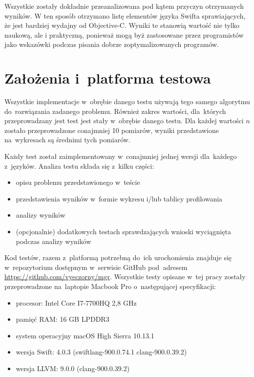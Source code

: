 \documentclass[mgr, shortabstract]{iithesis}
\begin{document}
Wszystkie zostały dokładnie przeanalizowana pod kątem przyczyn otrzymanych wyników. W ten sposób otrzymano listę elementów języka Swifta sprawiających, że jest bardziej wydajny od Objective-C. Wyniki te stanowią wartość nie tylko naukową, ale i praktyczną, ponieważ mogą byż zastosowane przez programistów jako wskazówki podczas pisania dobrze zoptymalizowanych programów.


\section{Założenia i~platforma testowa}

Wszystkie implementacje w~obrębie danego testu używają tego samego algorytmu do~rozwiązania zadanego problemu. Również zakres wartości, dla~których przeprowadzany jest test jest stały w~obrębie danego testu. Dla każdej wartości $n$ zostało przeprowadzone conajmniej 10 pomiarów, wyniki przedstawione na~wykresach są średnimi tych pomiarów.

Każdy test został zaimplementowany w~conajmniej jednej wersji dla~każdego z~języków. Analiza testu składa się z~kilku części:

\begin{itemize}
    \item opisu problemu przedstawionego w~teście
    \item przedstawienia wyników w~formie wykresu i/lub tablicy profilowania
    \item analizy wyników
    \item (opcjonalnie) dodatkowych testach sprawdzających wnioski wyciągnięta podczas analizy wyników
\end{itemize}

Kod testów, razem z~platformą potrzebną do~ich urochomienia znajduje się w~repozytorium dostępnym w~serwisie GitHub pod~adresem \url{https://github.com/vyeczorny/mgr}. Wszystkie testy opisane w~tej pracy zostały przeprowadzone na~laptopie Macbook Pro o~następującej specyfikacji:

\begin{itemize}
    \item procesor: Intel Core I7-7700HQ 2,8 GHz
    \item pamięć RAM: 16 GB LPDDR3
    \item system operacyjny macOS High Sierra 10.13.1
    \item wersja Swift: 4.0.3 (swiftlang-900.0.74.1 clang-900.0.39.2)
    \item wersja LLVM: 9.0.0 (clang-900.0.39.2)
\end{itemize}
\end{document}
